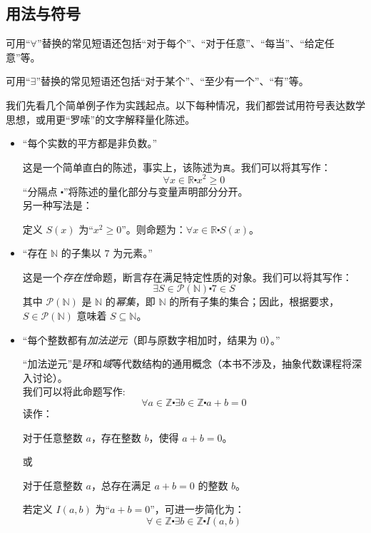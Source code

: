\subsection{用法与符号}
可用``$\forall$''替换的常见短语还包括``对于每个''、``对于任意''、``每当''、``给定任意''等。

可用``$\exists$''替换的常见短语还包括``对于某个''、``至少有一个''、``有''等。

\begin{example}
    我们先看几个简单例子作为实践起点。以下每种情况，我们都尝试用符号表达数学思想，或用更``罗嗦''的文字解释量化陈述。
    \begin{itemize}
        \item ``每个实数的平方都是非负数。''
        
            这是一个简单直白的陈述，事实上，该陈述为\verb|真|。我们可以将其写作：
            \[\forall x \in \mathbb{R} \centerdot x^2 \ge 0\]
            ``分隔点 $\centerdot$''将陈述的量化部分与变量声明部分分开。\\
            另一种写法是：
            \begin{center}
                定义 $S(x)$ 为``$x^2 \ge 0$''。则命题为：$\forall x \in \mathbb{R} \centerdot S(x)$。
            \end{center}
        \item ``存在 $\mathbb{N}$ 的子集以 $7$ 为元素。''
        
            这是一个\emph{存在性}命题，断言存在满足特定性质的对象。我们可以将其写作：
            \[\exists S \in \mathcal{P}(\mathbb{N}) \centerdot 7 \in S\]
            其中 $\mathcal{P}(\mathbb{N})$ 是 $\mathbb{N}$ 的\emph{幂集}，即 $\mathbb{N}$ 的所有子集的集合；因此，根据要求，$S \in \mathcal{P}(\mathbb{N})$ 意味着 $S \subseteq \mathbb{N}$。
        \item ``每个整数都有\emph{加法逆元}（即与原数字相加时，结果为 $0$）。''
        
            ``加法逆元''是\emph{环}和\emph{域}等代数结构的通用概念（本书不涉及，抽象代数课程将深入讨论）。\\
            我们可以将此命题写作:
            \[\forall a \in \mathbb{Z} \centerdot \exists b \in \mathbb{Z} \centerdot a + b = 0\]
            读作：
            \begin{center}
                对于任意整数 $a$，存在整数 $b$，使得 $a + b = 0$。
            \end{center}
            或
            \begin{center}
                对于任意整数 $a$，总存在满足 $a + b = 0$ 的整数 $b$。
            \end{center}
            若定义 $I(a, b)$ 为``$a + b = 0$''，可进一步简化为：
            \[\forall \in \mathbb{Z} \centerdot \exists b \in \mathbb{Z} \centerdot I(a, b)\]
    \end{itemize}
\end{example}

